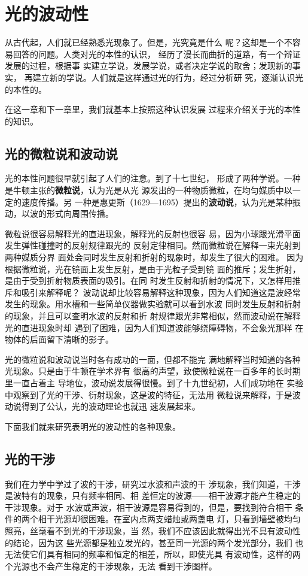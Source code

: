 
\chapter{光的波动性}
从古代起，人们就已经熟悉光现象了。但是，光究竟是什么
呢？这却是一个不容易回答的问题。人类对光的本性的认识，
经历了漫长而曲折的道路，有一个辩证发展的过程，根据事
实建立学说，发展学说，或者决定学说的取舍；发现新的事实，
再建立新的学说。人们就是这样通过光的行为，经过分析研
究，逐渐认识光的本性的。

在这一章和下一章里，我们就基本上按照这种认识发展
过程来介绍关于光的本性的知识。

\section{光的微粒说和波动说}
光的本性问题很早就引起了人们的注意。到了十七世纪，
形成了两种学说。一种是牛顿主张的\textbf{微粒说}，认为光是从光
源发出的一种物质微粒，在均匀媒质中以一定的速度传播。另
一种是惠更斯（1629—1695）提出的\textbf{波动说}，认为光是某种振
动，以波的形式向周围传播。

微粒说很容易解释光的直进现象，解释光的反射也很容
易，因为小球跟光滑平面发生弹性碰撞时的反射规律跟光的
反射定律相同。然而微粒说在解释一束光射到两种媒质分界
面处会同时发生反射和折射的现象时，却发生了很大的困难。
因为根据微粒说，光在镜面上发生反射，是由于光粒子受到镜
面的推斥；发生折射，是由于受到折射物质表面的吸引。在同
时发生反射和折射的情况下，又怎样用推斥和吸引来解释呢？
波动说却比较容易解释这种现象，因为人们知道这是波经常
发生的现象。用水槽和一些简单仪器做实验就可以看到水波
同时发生反射和折射的现象，并且可以查明水波的反射和折
射规律跟光非常相似，然而波动说在解释光的直进现象时却
遇到了困难，因为人们知道波能够绕障碍物，不会象光那样
在物体的后面留下清晰的影子。

光的微粒说和波动说当时各有成功的一面，但都不能完
满地解释当时知道的各种光现象。只是由于牛顿在学术界有
很高的声望，致使微粒说在一百多年的长时期里一直占着主
导地位，波动说发展得很慢。到了十九世纪初，人们成功地在
实验中观察到了光的干涉、衍射现象，这是波的特征，无法用
微粒说来解释，于是波动说得到了公认，光的波动理论也就迅
速发展起来。

下面我们就来研究表明光的波动性的各种现象。

\section{光的干涉}
我们在力学中学过了波的干涉，研究过水波和声波的干
涉现象，我们知道，干涉是波特有的现象，只有频率相同、相
差恒定的波源——相干波源才能产生稳定的干涉现象。对于
水波或声波，相干波源是容易得到的，但是，要找到符合相干
条件的两个相干光源却很困难。在室内点两支蜡烛或两盏电
灯，只看到墙壁被均匀照亮，丝毫看不到光的干涉现象，当
然，我们不应该因此就得出光不具有波动性的结论，因为这
些光源都是独立发光的，甚至同一光源的两个发光部分，我们
也无法使它们具有相同的频率和恒定的相差，所以，即使光具
有波动性，这样的两个光源也不会产生稳定的干涉现象，无法
看到干涉图样。

